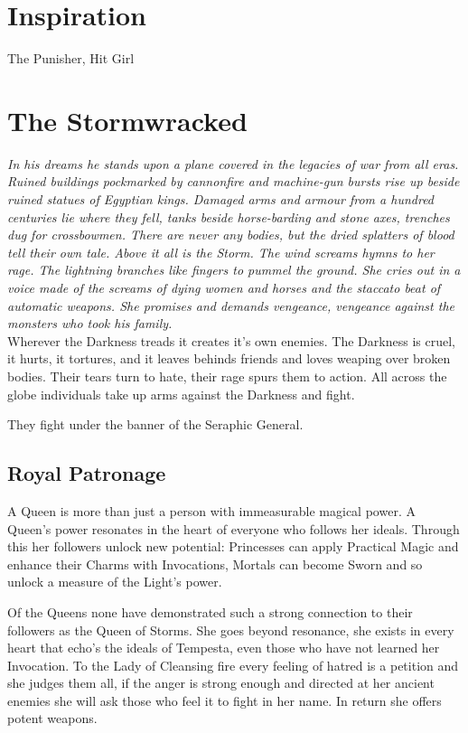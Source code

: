 \section*{Inspiration}
The Punisher, Hit Girl 

\section*{The Stormwracked}

\textit{In his dreams he stands upon a plane covered in the legacies of war from all eras. Ruined buildings pockmarked by cannonfire and machine-gun bursts rise up beside ruined statues of Egyptian kings. Damaged arms and armour from a hundred centuries lie where they fell, tanks beside horse-barding and stone axes, trenches dug for crossbowmen. There are never any bodies, but the dried splatters of blood tell their own tale. Above it all is the Storm. The wind screams hymns to her rage. The lightning branches like fingers to pummel the ground. She cries out in a voice made of the screams of dying women and horses and the staccato beat of automatic weapons. She promises and demands vengeance, vengeance against the monsters who took his family. }\\

\noindent Wherever the Darkness treads it creates it's own enemies. The Darkness is cruel, it hurts, it tortures, and it leaves behinds friends and loves weaping over broken bodies. Their tears turn to hate, their rage spurs them to action. All across the globe individuals take up arms against the Darkness and fight.

They fight under the banner of the Seraphic General.

\subsection*{Royal Patronage}

A Queen is more than just a person with immeasurable magical power. A Queen's power resonates in the heart of everyone who follows her ideals. Through this her followers unlock new potential: Princesses can apply Practical Magic and enhance their Charms with Invocations, Mortals can become Sworn and so unlock a measure of the Light's power.

Of the Queens none have demonstrated such a strong connection to their followers as the Queen of Storms. She goes beyond resonance, she exists in every heart that echo's the ideals of Tempesta, even those who have not learned her Invocation. To the Lady of Cleansing fire every feeling of hatred is a petition and she judges them all, if the anger is strong enough and directed at her ancient enemies she will ask those who feel it to fight in her name. In return she offers potent weapons.

